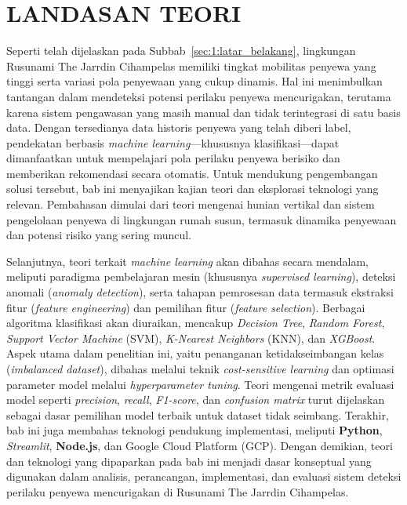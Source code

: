 \chapter{LANDASAN TEORI}
\label{chap:teori}

Seperti telah dijelaskan pada Subbab~\ref{sec:1:latar_belakang}, lingkungan Rusunami The Jarrdin Cihampelas memiliki tingkat mobilitas penyewa yang tinggi serta variasi pola penyewaan yang cukup dinamis. Hal ini menimbulkan tantangan dalam mendeteksi potensi perilaku penyewa mencurigakan, terutama karena sistem pengawasan yang masih manual dan tidak terintegrasi di satu basis data. Dengan tersedianya data historis penyewa yang telah diberi label, pendekatan berbasis \textit{machine learning}—khususnya klasifikasi—dapat dimanfaatkan untuk mempelajari pola perilaku penyewa berisiko dan memberikan rekomendasi secara otomatis. Untuk mendukung pengembangan solusi tersebut, bab ini menyajikan kajian teori dan eksplorasi teknologi yang relevan. Pembahasan dimulai dari teori mengenai hunian vertikal dan sistem pengelolaan penyewa di lingkungan rumah susun, termasuk dinamika penyewaan dan potensi risiko yang sering muncul.

Selanjutnya, teori terkait \textit{machine learning} akan dibahas secara mendalam, meliputi paradigma pembelajaran mesin (khususnya \textit{supervised learning}), deteksi anomali (\textit{anomaly detection}), serta tahapan pemrosesan data termasuk ekstraksi fitur (\textit{feature engineering}) dan pemilihan fitur (\textit{feature selection}). Berbagai algoritma klasifikasi akan diuraikan, mencakup \textit{Decision Tree}, \textit{Random Forest}, \textit{Support Vector Machine} (SVM), \textit{K-Nearest Neighbors} (KNN), dan \textit{XGBoost}. Aspek utama dalam penelitian ini, yaitu penanganan ketidakseimbangan kelas (\textit{imbalanced dataset}), dibahas melalui teknik \textit{cost-sensitive learning} dan optimasi parameter model melalui \textit{hyperparameter tuning}. Teori mengenai metrik evaluasi model seperti \textit{precision}, \textit{recall}, \textit{F1-score}, dan \textit{confusion matrix} turut dijelaskan sebagai dasar pemilihan model terbaik untuk dataset tidak seimbang. Terakhir, bab ini juga membahas teknologi pendukung implementasi, meliputi \textbf{Python}, \textit{Streamlit}, \textbf{Node.js}, dan Google Cloud Platform (GCP). Dengan demikian, teori dan teknologi yang dipaparkan pada bab ini menjadi dasar konseptual yang digunakan dalam analisis, perancangan, implementasi, dan evaluasi sistem deteksi perilaku penyewa mencurigakan di Rusunami The Jarrdin Cihampelas.

